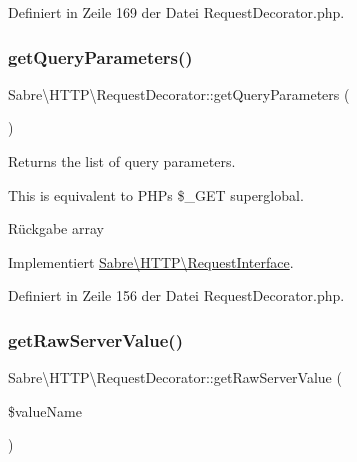 Definiert in Zeile 169 der Datei Request\+Decorator.\+php.

\mbox{\label{class_sabre_1_1_h_t_t_p_1_1_request_decorator_a53b080a564c253e8eb531c6d3bc193c8}} 
\subsubsection{\texorpdfstring{get\+Query\+Parameters()}{getQueryParameters()}}
{\footnotesize\ttfamily Sabre\textbackslash{}\+H\+T\+T\+P\textbackslash{}\+Request\+Decorator\+::get\+Query\+Parameters (\begin{DoxyParamCaption}{ }\end{DoxyParamCaption})}

Returns the list of query parameters.

This is equivalent to P\+HP\textquotesingle{}s \$\+\_\+\+G\+ET superglobal.

\begin{DoxyReturn}{Rückgabe}
array 
\end{DoxyReturn}


Implementiert \mbox{\hyperlink{interface_sabre_1_1_h_t_t_p_1_1_request_interface_a9e54c49278b75692ba00bd4f5932856f}{Sabre\textbackslash{}\+H\+T\+T\+P\textbackslash{}\+Request\+Interface}}.



Definiert in Zeile 156 der Datei Request\+Decorator.\+php.

\mbox{\label{class_sabre_1_1_h_t_t_p_1_1_request_decorator_a9e7d4fb06d30561c0bcf256a897afdaf}} 
\subsubsection{\texorpdfstring{get\+Raw\+Server\+Value()}{getRawServerValue()}}
{\footnotesize\ttfamily Sabre\textbackslash{}\+H\+T\+T\+P\textbackslash{}\+Request\+Decorator\+::get\+Raw\+Server\+Value (\begin{DoxyParamCaption}\item[{}]{\$value\+Name }\end{DoxyParamCaption})}

